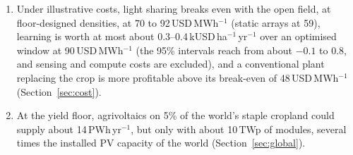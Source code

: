 \begin{enumerate}
\item Under illustrative costs, light sharing breaks even with the open field, at floor-designed densities, at 70 to 92\,USD\,MWh$^{-1}$ (static arrays at 59), learning is worth at most about 0.3--0.4\,kUSD\,ha$^{-1}$\,yr$^{-1}$ over an optimised window at 90\,USD\,MWh$^{-1}$ (the 95\% intervals reach from about $-0.1$ to 0.8, and sensing and compute costs are excluded), and a conventional plant replacing the crop is more profitable above its break-even of 48\,USD\,MWh$^{-1}$ (Section~\ref{sec:cost}).
\item At the yield floor, agrivoltaics on 5\% of the world's staple cropland could supply about 14\,PWh\,yr$^{-1}$, but only with about 10\,TWp of modules, several times the installed PV capacity of the world (Section~\ref{sec:global}).
\end{enumerate}
